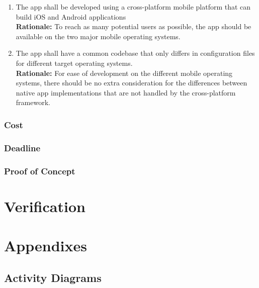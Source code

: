 \documentclass{article}
\begin{document}
\begin{enumerate}[align=left, label=\textbf{DI-P\arabic*.}]
    \item The app shall be developed using a cross-platform mobile platform that can build iOS and Android applications\\
    {\bf Rationale:} To reach as many potential users as possible, the app should be available on the two major mobile operating systems.
    \item The app shall have a common codebase that only differs in configuration files for different target operating systems.\\
    {\bf Rationale:} For ease of development on the different mobile operating systems, there should be no extra consideration for the differences between native app implementations that are not handled by the cross-platform framework.
\end{enumerate}

\subsubsection{Cost}


\subsubsection{Deadline}


\subsubsection{Proof of Concept}

\section{Verification}


\section{Appendixes}

\subsection{Activity Diagrams}
\label{sub:activity_diagrams}
\end{document}
